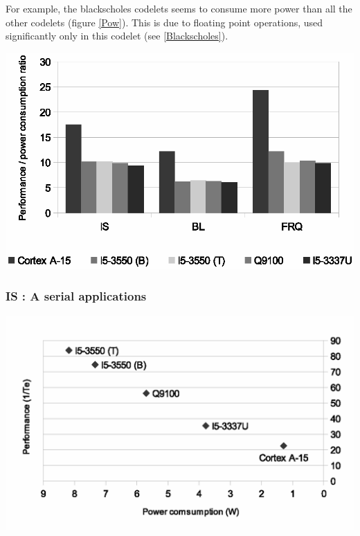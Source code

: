 \documentclass{article}
\newenvironment{Figure}
  {\par\medskip\noindent\center\minipage{0.9\linewidth}}
  {\endminipage\par\bigskip\medskip}
\begin{document}
\begin{multicols}{2}
For example, the blackscholes codelets seems to consume more power than all the other codelets (figure \ref{Pow}). This is due to floating point operations, used significantly only in this codelet (see \ref{Blackscholes}).


\begin{Figure}
\centering
\includegraphics[width=\linewidth]{Ratio.eps}
\end{Figure}


\subsubsection{IS : A serial applications}
\begin{Figure}
\centering
\includegraphics[width=\linewidth]{IS.eps}
\end{Figure}


\end{multicols}
\end{document}
